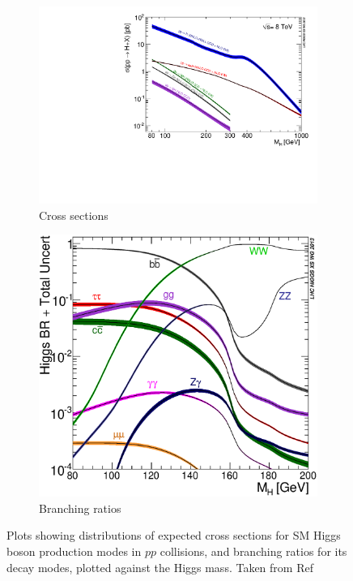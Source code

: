 \begin{figure}[!h]
\centering
\begin{subfigure}{0.55\textwidth}
   \includegraphics[width=\textwidth]{figures/Higgs_XS_8TeV_lx.pdf}
\caption{Cross sections}
\label{fig:higgsProdcomp}
\end{subfigure}%
\begin{subfigure}{0.45\textwidth}
   \includegraphics[width=\textwidth]{figures/Higgs_BR_LM.eps}
\caption{Branching ratios}
\label{fig:higgsDeccomp}
\end{subfigure}%
\caption{Plots showing distributions of expected cross sections for SM Higgs boson production modes in $pp$ collisions, and branching ratios for its 
decay modes, plotted against 
the Higgs mass. Taken from Ref~\cite{LHC:xs2016}}
\end{figure}

